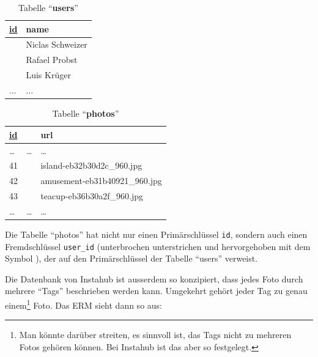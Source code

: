 \begin{minipage}{.38\textwidth}
\centering

\begin{table}[H]
\centering
\begin{tabular}{a|l}
   \underline{id} & name    \\\midrule
{}  & Niclas Schweizer    \\
  & Rafael Probst   \\
  & Luis Krüger  \\
... & ...
\end{tabular}
\caption{Tabelle \enquote{\textbf{users}}}
\label{table:users-2}
\end{table}
\end{minipage}
\begin{minipage}{.58\textwidth}
\centering
\begin{table}[H]
\centering
\begin{tabular}{a|l|l}
   \underline{id} & & url \\\midrule
  \dots & \dots & \dots \\
41 &    & island-eb32b30d2c\_960.jpg   \\
42&    & amusement-eb31b40921\_960.jpg    \\
43&     & teacup-eb36b30a2f\_960.jpg  \\
\dots & \dots& \dots
\end{tabular}
\caption{Tabelle \enquote{\textbf{photos}}}
\label{table:photos-2}
\end{table}
\end{minipage}

Die Tabelle \enquote{photos} hat nicht nur einen Primärschlüssel \texttt{id}, sondern auch einen Fremdschlüssel \texttt{user\_id} (unterbrochen unterstrichen und hervorgehoben mit dem Symbol \faKey), der auf den Primärschlüssel der Tabelle \enquote{users} verweist. 

Die Datenbank von Instahub ist ausserdem so konzipiert, dass jedes Foto durch mehrere \enquote{Tags} beschrieben werden kann. Umgekehrt gehört jeder Tag zu genau einem\footnote{Man könnte darüber streiten, es sinnvoll ist, das Tags nicht zu mehreren Fotos gehören können. Bei Instahub ist das aber so festgelegt.} Foto. Das ERM sieht dann so aus:

